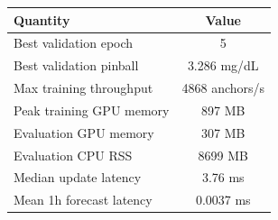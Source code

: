 \begin{tabular}{lc}
\toprule
Quantity & Value \\
\midrule
Best validation epoch & 5 \\
Best validation pinball & 3.286 mg/dL \\
Max training throughput & 4868 anchors/s \\
Peak training GPU memory & 897 MB \\
Evaluation GPU memory & 307 MB \\
Evaluation CPU RSS & 8699 MB \\
Median update latency & 3.76 ms \\
Mean 1h forecast latency & 0.0037 ms \\
\bottomrule
\end{tabular}
